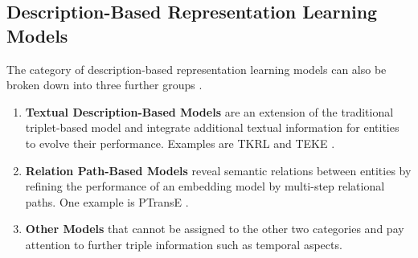 \subsection{Description-Based Representation Learning Models}
\label{subsec:description_based_representation_learning_models}

The category of description-based representation learning models can also be broken down into three further groups \cite{electronics9050750}.
\begin{enumerate}
    \item 
    \textbf{Textual Description-Based Models} are an extension of the traditional triplet-based model and integrate additional textual information for entities to evolve their performance.
    Examples are \ac{TKRL} \cite{TKRL} and \ac{TEKE} \cite{TEKE}.
    
    \item 
    \textbf{Relation Path-Based Models} reveal semantic relations between entities by refining the performance of an embedding model by multi-step relational paths.
    One example is \ac{PTransE} \cite{PTransE}.
    
    \item 
    \textbf{Other Models} that cannot be assigned to the other two categories and pay attention to further triple information such as temporal aspects.
\end{enumerate}
